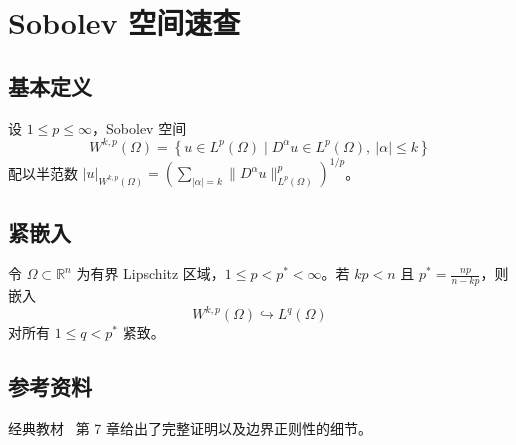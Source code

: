 \documentclass[../../main.tex]{subfiles}
\begin{document}
\chapter{Sobolev 空间速查}

\section{基本定义}
设 $1 \leq p \leq \infty$，Sobolev 空间
\[
  W^{k,p}(\Omega) = \left\{ u \in L^p(\Omega) \mid D^\alpha u \in L^p(\Omega),\ |\alpha| \leq k \right\}
\]
配以半范数
$|u|_{W^{k,p}(\Omega)} = \left( \sum_{|\alpha| = k} \|D^\alpha u\|_{L^p(\Omega)}^p \right)^{1/p}$。

\section{紧嵌入}
\begin{theorem}
  令 $\Omega \subset \mathbb{R}^n$ 为有界 Lipschitz 区域，$1 \leq p < p^\ast < \infty$。若
  $k p < n$ 且 $p^\ast = \frac{np}{n - kp}$，则嵌入
  \[
    W^{k,p}(\Omega) \hookrightarrow L^{q}(\Omega)
  \]
  对所有 $1 \leq q < p^\ast$ 紧致。
\end{theorem}

\section{参考资料}
经典教材~\cite{gilbarg2001} 第 7 章给出了完整证明以及边界正则性的细节。

\printbibliography[heading=subbibliography]
\end{document}
